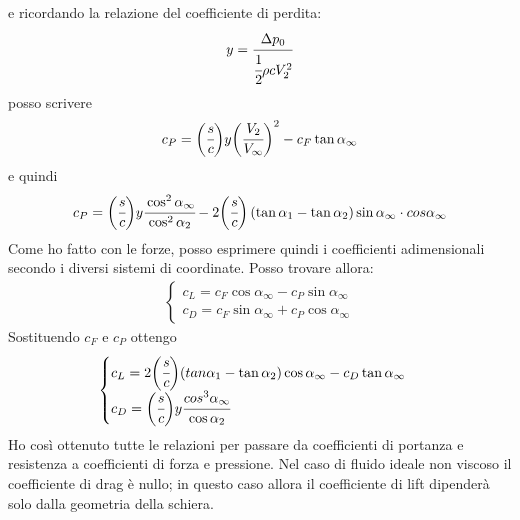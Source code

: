 e ricordando la relazione del coefficiente di perdita:
\begin{align*}
y = \cfrac{\Delta p_0}{\cfrac{1}{2} \rho c V_2^2}
\end{align*}
posso scrivere
\begin{align*}
c_P = \bigg(\cfrac{s}{c}\bigg)y \bigg(\cfrac{V_2}{V_{\infty}}\bigg)^2 - c_F \tan \alpha_{\infty}
\end{align*}
e quindi
\begin{equation}
c_P = \bigg(\cfrac{s}{c}\bigg)y \cfrac{\cos^2 \alpha_{\infty}}{\cos^2 \alpha_2} -2\bigg(\cfrac{s}{c}\bigg) \left(\tan \alpha_1 - \tan \alpha_2 \right) \sin \alpha_{\infty} \cdot cos \alpha_{\infty}
\end{equation} 
Come ho fatto con le forze, posso esprimere quindi i coefficienti adimensionali secondo i diversi sistemi di coordinate. Posso trovare allora:
\begin{align*}
\begin{cases}
c_L = c_F \cos \alpha_{\infty} - c_P \sin \alpha_{\infty} \\
c_D = c_F \sin \alpha_{\infty} + c_P \cos \alpha_{\infty}
\end{cases}
\end{align*}
Sostituendo $c_F$ e $c_P$ ottengo
\begin{equation}
\begin{cases}
c_L = 2 \bigg(\cfrac{s}{c}\bigg) (tan \alpha_1 - \tan \alpha_2) \cos \alpha_{\infty} - c_D \tan \alpha_{\infty} \\
c_D = \bigg(\cfrac{s}{c}\bigg) y \cfrac{cos^3 \alpha_{\infty}}{\cos \alpha_2}
\end{cases}
\end{equation}
Ho così ottenuto tutte le relazioni per passare da coefficienti di portanza e resistenza a coefficienti di forza e pressione. Nel caso di fluido ideale non viscoso il coefficiente di drag è nullo; in questo caso allora il coefficiente di lift dipenderà solo dalla geometria della schiera.
